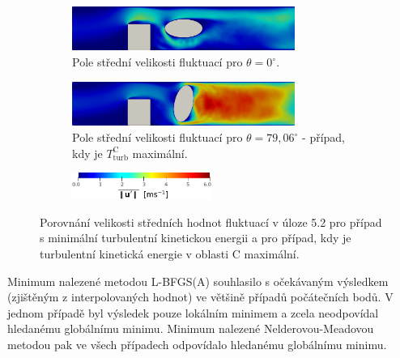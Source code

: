 \begin{figure}[H]
	\centering
	\begin{subfigure}[b]{1.0\textwidth}
		\begin{center}
			\centering
			\includegraphics[width=0.8\textwidth, trim={0mm 0mm 0mm 0mm}]{Images/ellipse2_min_aa.png}
			\vspace{2mm}
			\caption{Pole střední velikosti fluktuací pro $ \theta = 0^{\circ}$.}
			\label{fig:elip2_0}
		\end{center}
		\vspace{2.8mm}
	\end{subfigure}
	\begin{subfigure}[b]{1.0\textwidth}
		\centering
		\includegraphics[width=0.8\textwidth, trim={0 0mm 0 0mm}]{Images/ellipse2_max_a.png}
		\vspace{1.8mm}
		\caption{Pole střední velikosti fluktuací pro $ \theta = 79{,}06^{\circ}$ - případ, kdy je $ T^{\text{C}}_{\text{turb}} $ maximální.}
		\label{fig:elip2_79}
	\end{subfigure}
	\begin{subfigure}[b]{1.0\textwidth}
		\centering
		\vspace{2.5mm}
		\includegraphics[width=0.5\textwidth, trim={0 0mm 0 0mm}]{Images/ellipse12_legenda.png}
	\end{subfigure}
	\caption{Porovnání velikosti středních hodnot fluktuací v úloze 5.2 pro případ s minimální turbulentní kinetickou energii a pro případ, kdy je turbulentní kinetická energie v oblasti C maximální.}
	\label{fig:2}
\end{figure}

Minimum nalezené metodou L-BFGS(A) souhlasilo s očekávaným výsledkem (zjištěným z interpolovaných hodnot) ve většině případů počátečních bodů. V jednom případě byl výsledek pouze lokálním minimem a zcela neodpovídal hledanému globálnímu minimu. Minimum nalezené Nelderovou-Meadovou metodou pak ve všech případech odpovídalo hledanému globálnímu minimu.

